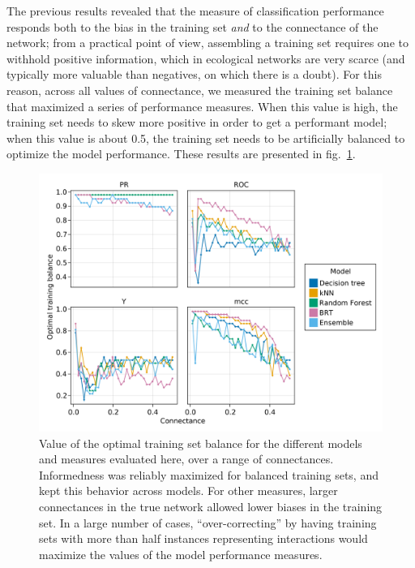 \documentclass[10pt,oneside]{article}
\makeatletter
\def\maxwidth{\ifdim\Gin@nat@width>\linewidth\linewidth
\else\Gin@nat@width\fi}
\let\Oldincludegraphics\includegraphics
\renewcommand{\includegraphics}[1]{\Oldincludegraphics[width=\maxwidth]{#1}}
\makeatother
\begin{document}
The previous results revealed that the measure of classification
performance responds both to the bias in the training set \emph{and} to
the connectance of the network; from a practical point of view,
assembling a training set requires one to withhold positive information,
which in ecological networks are very scarce (and typically more
valuable than negatives, on which there is a doubt). For this reason,
across all values of connectance, we measured the training set balance
that maximized a series of performance measures. When this value is
high, the training set needs to skew more positive in order to get a
performant model; when this value is about 0.5, the training set needs
to be artificially balanced to optimize the model performance. These
results are presented in fig.~\ref{fig:optimbias}.

\begin{figure}
\hypertarget{fig:optimbias}{%
\centering
\includegraphics{figures/optimal_bias.png}
\caption{Value of the optimal training set balance for the different
models and measures evaluated here, over a range of connectances.
Informedness was reliably maximized for balanced training sets, and kept
this behavior across models. For other measures, larger connectances in
the true network allowed lower biases in the training set. In a large
number of cases, ``over-correcting'' by having training sets with more
than half instances representing interactions would maximize the values
of the model performance measures.}\label{fig:optimbias}
}
\end{figure}
\end{document}
